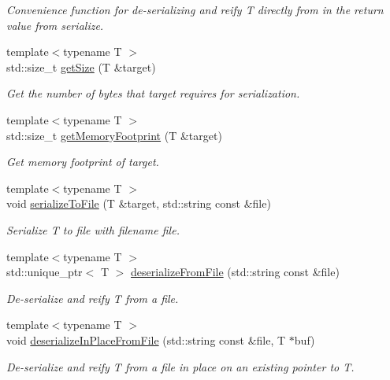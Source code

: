 \begin{DoxyCompactItemize}
\begin{DoxyCompactList}\small\item\em Convenience function for de-\/serializing and reify {\ttfamily T} directly from {\ttfamily in} the return value from {\ttfamily serialize}. \end{DoxyCompactList}\item 
{\footnotesize template$<$typename T $>$ }\\std\+::size\+\_\+t \hyperlink{namespacecheckpoint_af0e68ef201b5e6831939bcd752e1b18b}{get\+Size} (T \&target)
\begin{DoxyCompactList}\small\item\em Get the number of bytes that {\ttfamily target} requires for serialization. \end{DoxyCompactList}\item 
{\footnotesize template$<$typename T $>$ }\\std\+::size\+\_\+t \hyperlink{namespacecheckpoint_a1cad6374d2a7202cc8f3e905d279c2da}{get\+Memory\+Footprint} (T \&target)
\begin{DoxyCompactList}\small\item\em Get memory footprint of {\ttfamily target}. \end{DoxyCompactList}\item 
{\footnotesize template$<$typename T $>$ }\\void \hyperlink{namespacecheckpoint_a3d4326982e3c3feeb933e985758eea82}{serialize\+To\+File} (T \&target, std\+::string const \&file)
\begin{DoxyCompactList}\small\item\em Serialize {\ttfamily T} to file with filename {\ttfamily file}. \end{DoxyCompactList}\item 
{\footnotesize template$<$typename T $>$ }\\std\+::unique\+\_\+ptr$<$ T $>$ \hyperlink{namespacecheckpoint_ad71bcfe197379c59aa16f737b7e2cf3e}{deserialize\+From\+File} (std\+::string const \&file)
\begin{DoxyCompactList}\small\item\em De-\/serialize and reify {\ttfamily T} from a file. \end{DoxyCompactList}\item 
{\footnotesize template$<$typename T $>$ }\\void \hyperlink{namespacecheckpoint_a4a98c599eb8a73519cd643bfafb739d5}{deserialize\+In\+Place\+From\+File} (std\+::string const \&file, T $\ast$buf)
\begin{DoxyCompactList}\small\item\em De-\/serialize and reify {\ttfamily T} from a file in place on an existing pointer to {\ttfamily T}. \end{DoxyCompactList}\item 

\end{DoxyCompactItemize}
